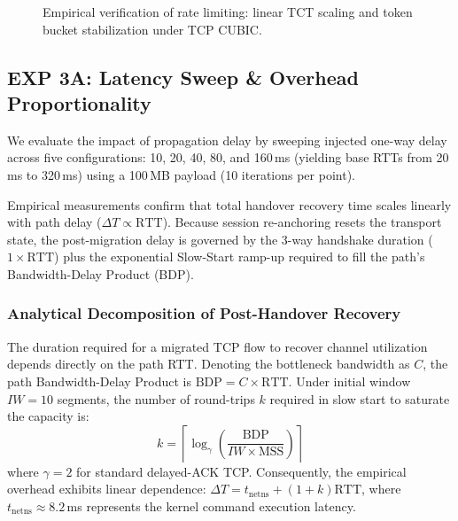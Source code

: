 \documentclass[conference]{IEEEtran}
\begin{document}
\begin{figure}[htbp]
\centering
{}
\caption{\textcolor{extensioncolor}{Empirical verification of rate limiting: linear TCT scaling and token bucket stabilization under TCP CUBIC.}}
\label{fig:exp1_linearity}
\end{figure}

\subsection{EXP 3A: Latency Sweep \& Overhead Proportionality}
We evaluate the impact of propagation delay by sweeping injected one-way delay across five configurations: 10, 20, 40, 80, and 160\,ms (yielding base RTTs from 20\,ms to 320\,ms) using a 100\,MB payload (10 iterations per point).

Empirical measurements confirm that total handover recovery time scales linearly with path delay ($\Delta T \propto \text{RTT}$). Because session re-anchoring resets the transport state, the post-migration delay is governed by the 3-way handshake duration ($1 \times \text{RTT}$) plus the exponential Slow-Start ramp-up required to fill the path's Bandwidth-Delay Product (BDP).

\textcolor{extensioncolor}{
\subsubsection{Analytical Decomposition of Post-Handover Recovery}
The duration required for a migrated TCP flow to recover channel utilization depends directly on the path RTT. Denoting the bottleneck bandwidth as $C$, the path Bandwidth-Delay Product is $\text{BDP} = C \times \text{RTT}$. Under initial window $IW = 10$ segments, the number of round-trips $k$ required in slow start to saturate the capacity is:
\begin{equation}
k = \left\lceil \log_{\gamma} \left( \frac{\text{BDP}}{IW \times \text{MSS}} \right) \right\rceil
\end{equation}
where $\gamma = 2$ for standard delayed-ACK TCP. Consequently, the empirical overhead exhibits linear dependence: $\Delta T = t_{\text{netns}} + (1 + k)\text{RTT}$, where $t_{\text{netns}} \approx 8.2$\,ms represents the kernel command execution latency.
}
\end{document}
